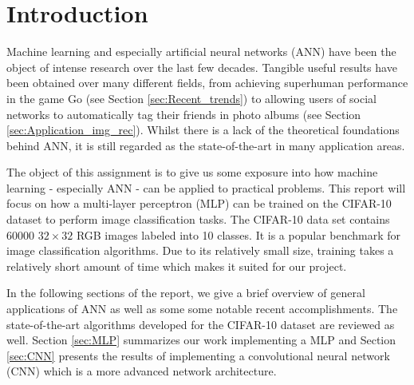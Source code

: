 \section{Introduction}
    \pagestyle{tom}

Machine learning and especially artificial neural networks (ANN) have been the object of intense research over the last few decades. Tangible useful results have been obtained over many different fields, from achieving superhuman performance in the game Go (see Section \ref{sec:Recent_trends}) to allowing users of social networks to automatically tag their friends in photo albums (see Section \ref{sec:Application_img_rec}). Whilst there is a lack of the theoretical foundations behind ANN, it is still regarded as the state-of-the-art in many application areas.

The object of this assignment is to give us some exposure into how machine learning - especially ANN - can be applied to practical problems. This report will focus on how a multi-layer perceptron (MLP) can be trained on the CIFAR-10 dataset to perform image classification tasks. The CIFAR-10 data set contains 60000 $32\times32$ RGB images labeled into 10 classes. It is a popular benchmark for image classification algorithms. Due to its relatively small size, training takes a relatively short amount of time which makes it suited for our project.

In the following sections of the report, we give a brief overview of general applications of ANN as well as some some notable recent accomplishments. The state-of-the-art algorithms developed for the CIFAR-10 dataset are reviewed as well. Section \ref{sec:MLP} summarizes our work implementing a MLP and Section \ref{sec:CNN} presents the results of implementing a convolutional neural network (CNN) which is a more advanced network architecture.
